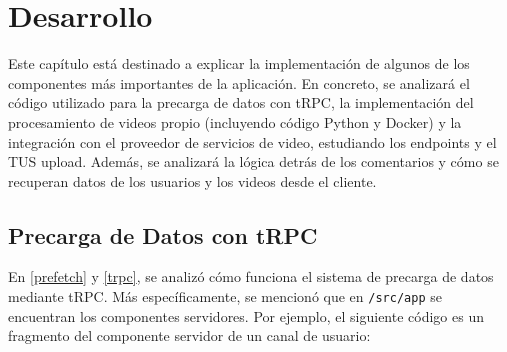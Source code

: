 \chapter{Desarrollo}

Este capítulo está destinado a explicar la implementación de algunos de los componentes más importantes de la aplicación. En concreto, se analizará el código utilizado para la precarga de datos con tRPC, la implementación del procesamiento de videos propio (incluyendo código Python y Docker) y la integración con el proveedor de servicios de video, estudiando los endpoints y el TUS upload. Además, se analizará la lógica detrás de los comentarios y cómo se recuperan datos de los usuarios y los videos desde el cliente.


\section{Precarga de Datos con tRPC}

En \ref{prefetch} y \ref{trpc}, se analizó cómo funciona el sistema de precarga de datos mediante tRPC. Más específicamente, se mencionó que en  \texttt{/src/app} se encuentran los componentes servidores. Por ejemplo, el siguiente código es un fragmento del componente servidor de un canal de usuario:

